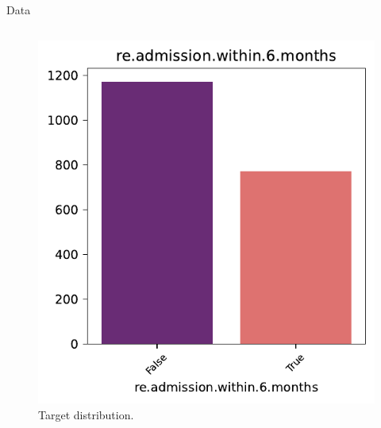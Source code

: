 \documentclass[aspectratio=169,xcolor=dvipsnames]{beamer}
\begin{document}
\begin{frame}{Data}
\begin{columns}[t]
        \pause
        \begin{figure}[htpb]
            \centering
            \includegraphics[width=\textwidth]{plot_target.pdf}
            \captionsetup{font=tiny} %
            \caption{Target distribution.}
        \end{figure}
        

    \end{columns}
\end{frame}

\end{document}
